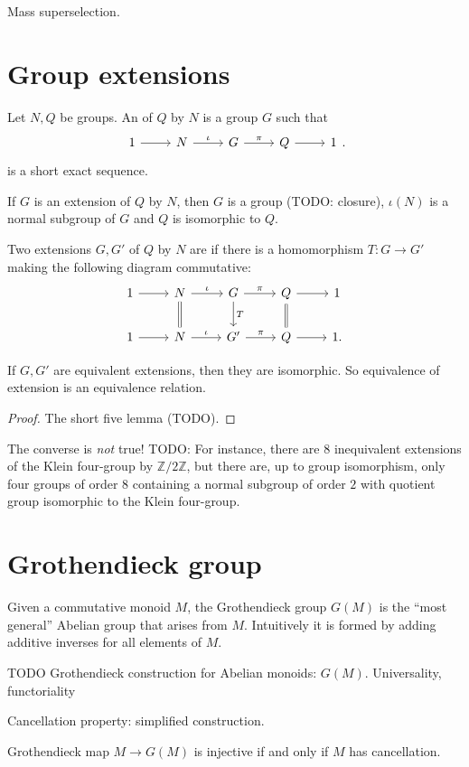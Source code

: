 Mass superselection.

\section{Group extensions}
\begin{definition}
Let $N,Q$ be groups. An  of $Q$ by $N$ is a group $G$ such that
\[
\begin{tikzcd}
1 \ar[r] & N \ar[r, "\iota"] & G \ar[r, "\pi"] & Q \ar[r] & 1
\end{tikzcd}.
\]
is a short exact sequence.
\end{definition}
\begin{lemma}
If $G$ is an extension of $Q$ by $N$, then $G$ is a group (TODO: closure), $\iota(N)$ is a normal subgroup of $G$ and $Q$ is isomorphic to $Q$.
\end{lemma}

\begin{definition}
Two extensions $G,G'$ of $Q$ by $N$ are  if there is a homomorphism $T:G\to G'$ making the following diagram commutative:
\[
\begin{tikzcd}
1 \ar[r] & N \ar[r, "\iota"] \ar[equal]{d} & G \ar[r, "\pi"] \ar[d,"T"] & Q \ar[r] \ar[d, equal] & 1 \\
1 \ar[r] & N \ar[r, "\iota"] & G' \ar[r, "\pi"] & Q \ar[r] & 1.
\end{tikzcd}
\]
\end{definition}
\begin{lemma}
If $G,G'$ are equivalent extensions, then they are isomorphic. So equivalence of extension is an equivalence relation.
\end{lemma}
\begin{proof}
The short five lemma (TODO).
\end{proof}
The converse is \emph{not} true! TODO: For instance, there are $8$ inequivalent extensions of the Klein four-group by $\mathbb{Z}/2\mathbb{Z}$, but there are, up to group isomorphism, only four groups of order $8$ containing a normal subgroup of order $2$ with quotient group isomorphic to the Klein four-group.

\section{Grothendieck group}
Given a commutative monoid $M$, the Grothendieck group $G(M)$ is the ``most general'' Abelian group that arises from $M$. Intuitively it is formed by adding additive inverses for all elements of $M$.



 
TODO Grothendieck construction for Abelian monoids: $G(M)$.
Universality, functoriality

Cancellation property: simplified construction.

Grothendieck map $M\to G(M)$ is injective \textup{if and only if} $M$ has cancellation.